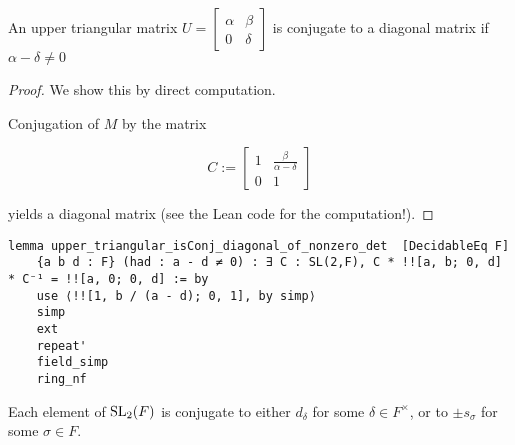 \begin{lemma}
    \label{upper_triangular_isConj_diagonal_of_nonzero_det}
    \leanok
    An upper triangular matrix $U = \begin{bmatrix}
        \alpha & \beta\\
        0 & \delta
    \end{bmatrix}$ is conjugate to a diagonal matrix if $\alpha - \delta \ne 0$
\end{lemma}
\begin{proof}
    \leanok
We show this by direct computation.

Conjugation of $M$ by the matrix 

\[
C := \begin{bmatrix}
    1 & \frac{\beta}{\alpha - \delta}\\
    0 & 1
\end{bmatrix}
\]

yields a diagonal matrix (see the Lean code for the computation!).
\end{proof}
\begin{footnotesize}
\begin{verbatim}
lemma upper_triangular_isConj_diagonal_of_nonzero_det  [DecidableEq F]
    {a b d : F} (had : a - d ≠ 0) : ∃ C : SL(2,F), C * !![a, b; 0, d] * C⁻¹ = !![a, 0; 0, d] := by
    use ⟨!![1, b / (a - d); 0, 1], by simp⟩
    simp
    ext
    repeat'
    field_simp
    ring_nf
\end{verbatim}
\end{footnotesize}



\begin{proposition}
\label{SL2_IsConj_d_or_IsConj_s_or_IsConj_neg_s_of_AlgClosed}
\leanok
    Each element of $\operatorname{SL}_2(F)$ is conjugate to either $d_\delta$ for some $\delta \in F^\times$, or to $\pm s_\sigma$ for some $\sigma \in F$.
\end{proposition}

